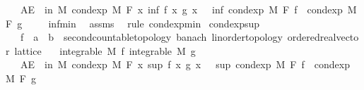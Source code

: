 \begin{isabellebody}
\ \ \ {\isachardoublequoteopen}AE\ {\isasymxi}\ in\ M{\isachardot}{\kern0pt}\ cond{\isacharunderscore}{\kern0pt}exp\ M\ F\ {\isacharparenleft}{\kern0pt}{\isasymlambda}x{\isachardot}{\kern0pt}\ inf\ {\isacharparenleft}{\kern0pt}f\ x{\isacharparenright}{\kern0pt}\ {\isacharparenleft}{\kern0pt}g\ x{\isacharparenright}{\kern0pt}{\isacharparenright}{\kern0pt}\ {\isasymxi}\ {\isasymle}\ inf\ {\isacharparenleft}{\kern0pt}cond{\isacharunderscore}{\kern0pt}exp\ M\ F\ f\ {\isasymxi}{\isacharparenright}{\kern0pt}\ {\isacharparenleft}{\kern0pt}cond{\isacharunderscore}{\kern0pt}exp\ M\ F\ g\ {\isasymxi}{\isacharparenright}{\kern0pt}{\isachardoublequoteclose}\isanewline
%
\isadelimproof
\ \ %
\endisadelimproof
%
\isatagproof
{}\isamarkupfalse%
\ inf{\isacharunderscore}{\kern0pt}min\ \isamarkupfalse%
\ assms\ \isamarkupfalse%
\ {\isacharparenleft}{\kern0pt}rule\ cond{\isacharunderscore}{\kern0pt}exp{\isacharunderscore}{\kern0pt}min{\isacharparenright}{\kern0pt}%
\endisatagproof
{\isafoldproof}%
%
\isadelimproof
\isanewline
%
\endisadelimproof
\isanewline
{}\isamarkupfalse%
\ cond{\isacharunderscore}{\kern0pt}exp{\isacharunderscore}{\kern0pt}sup{\isacharcolon}{\kern0pt}\isanewline
\ \ \ f\ {\isacharcolon}{\kern0pt}{\isacharcolon}{\kern0pt}\ {\isachardoublequoteopen}{\isacharprime}{\kern0pt}a\ {\isasymRightarrow}\ {\isacharprime}{\kern0pt}b\ {\isacharcolon}{\kern0pt}{\isacharcolon}{\kern0pt}\ {\isacharbraceleft}{\kern0pt}second{\isacharunderscore}{\kern0pt}countable{\isacharunderscore}{\kern0pt}topology{\isacharcomma}{\kern0pt}\ banach{\isacharcomma}{\kern0pt}\ linorder{\isacharunderscore}{\kern0pt}topology{\isacharcomma}{\kern0pt}\ ordered{\isacharunderscore}{\kern0pt}real{\isacharunderscore}{\kern0pt}vector{\isacharcomma}{\kern0pt}\ lattice{\isacharbraceright}{\kern0pt}{\isachardoublequoteclose}\isanewline
\ \ \ {\isachardoublequoteopen}integrable\ M\ f{\isachardoublequoteclose}\ {\isachardoublequoteopen}integrable\ M\ g{\isachardoublequoteclose}\isanewline
\ \ \ {\isachardoublequoteopen}AE\ {\isasymxi}\ in\ M{\isachardot}{\kern0pt}\ cond{\isacharunderscore}{\kern0pt}exp\ M\ F\ {\isacharparenleft}{\kern0pt}{\isasymlambda}x{\isachardot}{\kern0pt}\ sup\ {\isacharparenleft}{\kern0pt}f\ x{\isacharparenright}{\kern0pt}\ {\isacharparenleft}{\kern0pt}g\ x{\isacharparenright}{\kern0pt}{\isacharparenright}{\kern0pt}\ {\isasymxi}\ {\isasymge}\ sup\ {\isacharparenleft}{\kern0pt}cond{\isacharunderscore}{\kern0pt}exp\ M\ F\ f\ {\isasymxi}{\isacharparenright}{\kern0pt}\ {\isacharparenleft}{\kern0pt}cond{\isacharunderscore}{\kern0pt}exp\ M\ F\ g\ {\isasymxi}{\isacharparenright}{\kern0pt}{\isachardoublequoteclose}\isanewline

\end{isabellebody}
